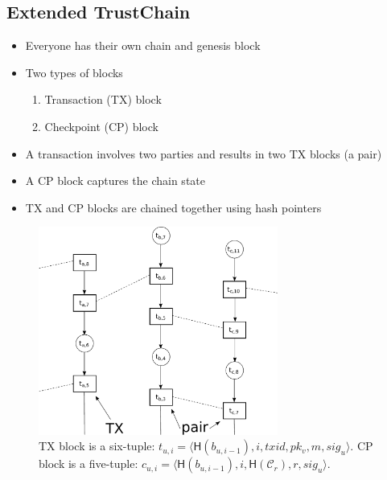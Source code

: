 \documentclass{beamer}
\newcommand{\C}{\mathcal{C}}
\begin{document}
\subsection{Extended TrustChain}
\begin{frame}{\subsecname}
  \begin{itemize}
    \item Everyone has their own chain and genesis block
    \item Two types of blocks
      \begin{enumerate}
      \item Transaction (TX) block
      \item Checkpoint (CP) block
      \end{enumerate}
    \item A transaction involves two parties and results in two TX blocks (a pair)
    \item A CP block captures the chain state
    \item TX and CP blocks are chained together using hash pointers
  \end{itemize}
\end{frame}

\begin{frame}{\subsecname}
  \begin{figure}[h]
  \includegraphics[width=0.7\textwidth]{trustchain-good-cp}
  \centering
  \caption{TX block is a six-tuple: $t_{u, i} = \langle \textsf{H}(b_{u, i - 1}), i, txid, pk_v, m, sig_u \rangle$.
    CP block is a five-tuple: $c_{u, i} = \langle \textsf{H}(b_{u, i-1}), i, \textsf{H}(\C_r), r, sig_u \rangle$.}
  \end{figure}
\end{frame}
\end{document}
